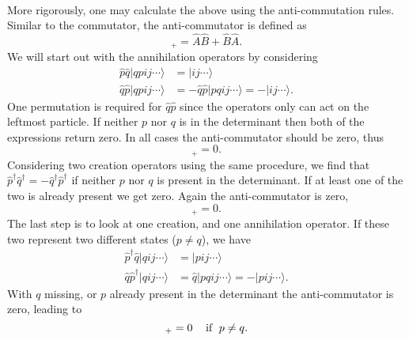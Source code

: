 \paragraph*{}
More rigorously, one may calculate the above using the  anti-commutation rules. 
Similar to the commutator, the anti-commutator is defined as 
\begin{equation}
[\hat{A},\hat{B}]_+ = \hat{A} \hat{B} + \hat{B} \hat{A} .
\end{equation}
We will start out with the annihilation operators by considering 
\begin{equation}
\begin{split}
\hat{p}\hat{q} | qpij\cdots \rangle &= |ij\cdots \rangle
\\
\hat{q}\hat{p} | qpij\cdots \rangle &= - \hat{q}\hat{p} | pqij\cdots \rangle = - | ij\cdots \rangle .
\end{split}
\end{equation}
One permutation is required for $\hat{q}\hat{p}$ since the operators only can act on the leftmost particle.
If neither $p$ nor $q$ is in the determinant then both of the expressions return zero.
In all cases the anti-commutator should be zero, thus
\begin{equation}
[\hat{p},\hat{q}]_+ = 0 .
\end{equation}
Considering two creation operators using the same procedure, we find that
$\hat{p}^{\dagger} \hat{q}^{\dagger} = - \hat{q}^{\dagger} \hat{p}^{\dagger}$
if neither $p$ nor $q$ is present in the determinant. If at least one of the
two is already present we get zero. Again the anti-commutator is zero, 
\begin{equation}
[\hat{p}^{\dagger},\hat{q}^{\dagger}]_+ = 0 .
\end{equation}
The last step is to look at one creation, and one annihilation operator.
If these two represent two different states ($p \neq q$), we have
\begin{equation}
\begin{split}
\hat{p}^{\dagger} \hat{q} |q ij\cdots \rangle &= |pij\cdots \rangle
\\
\hat{q} \hat{p}^{\dagger} |q ij\cdots \rangle &= 
\hat{q} |pqij\cdots \rangle = - |pij\cdots \rangle .
\end{split}
\end{equation}
With $q$ missing, or $p$ already present in the determinant the anti-commutator is zero, leading to 
\begin{equation}
[\hat{p}^{\dagger},\hat{q}]_+ = 0 \hspace{3mm}\textrm{ if }\hspace{1mm} p \neq q .
\end{equation}
